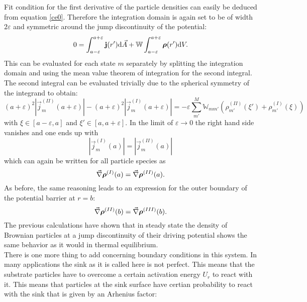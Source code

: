 Fit condition for the first derivative of the particle densities can easily be deduced from equation \eqref{ce0}. Therefore the integration domain is again set to be of width $2 \varepsilon$ and symmetric around the jump discontinuity of the potential:
\begin{equation}
    0 = \int_{a-\varepsilon}^{a+\varepsilon} \boldsymbol{\mathbf{j}}(r') {\rm d} \vec{A} + \mathbb{W} \int_{a-\varepsilon}^{a+\varepsilon} \boldsymbol{\mathbf{\rho}}(r') {\rm d} V.
    \label{ce9}
\end{equation}
This can be evaluated for each state $m$ separately by splitting the integration domain and using the mean value theorem of integration for the second integral. The second integral can be evaluated trivially due to the spherical symmetry of the integrand to obtain:
\begin{equation}
    (a+\varepsilon)^2 |\vec{j}^{(II)}_m(a+\varepsilon)| - (a+\varepsilon)^2 |\vec{j}^{(I)}_m(a+\varepsilon)| = - \varepsilon \sum_{m'}^{M} \mathbb{W}_{mm'} \left( \rho^{(II)}_{m'}(\xi') + \rho^{(I)}_{m'}(\xi) \right)
    \label{ce10}
\end{equation}
with $\xi \in [a-\varepsilon,a]$ and $\xi' \in [a,a+\varepsilon]$. In the limit of $\varepsilon \rightarrow 0$ the right hand side vanishes and one ends up with 
\begin{equation}
    |\vec{j}^{(I)}_m(a)| =  |\vec{j}^{(II)}_m(a)|
    \label{ce11}
\end{equation}
which can again be written for all particle species as
\begin{equation}
    \vec{\nabla}\boldsymbol{\mathbf{\rho}}^{(I)}(a) = \vec{\nabla}\boldsymbol{\mathbf{\rho}}^{(II)}(a).
    \label{ddens_fit}
\end{equation}
As before, the same reasoning leads to an expression for the outer boundary of the potential barrier at $r=b$:
\begin{equation}
    \vec{\nabla}\boldsymbol{\mathbf{\rho}}^{(II)}(b) = \vec{\nabla}\boldsymbol{\mathbf{\rho}}^{(III)}(b).
    \label{ddens_fit_b}
\end{equation}
The previous calculations have shown that in steady state the density of Brownian particles at a jump discontinuity of their driving potential shows the same behavior as it would in thermal equilibrium. \\
There is one more thing to add concerning boundary conditions in this system. In many applications the sink as it is called here is not perfect. This means that the substrate particles have to overcome a certain activation energy $U_r$ to react with it. This means that particles at the sink surface have certian probability to react with the sink that is given by an Arhenius factor:
